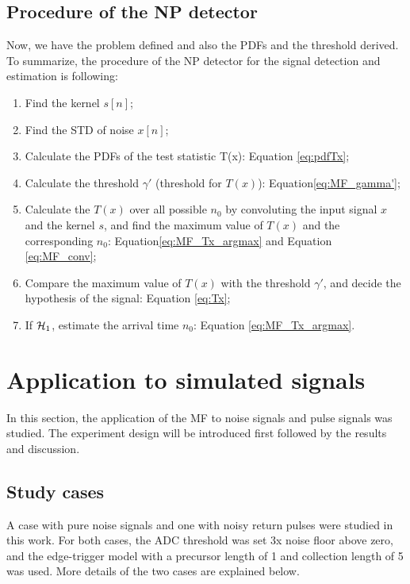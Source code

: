 \subsection{Procedure of the NP detector}
Now, we have the problem defined and also the PDFs and the threshold derived. To summarize, the procedure of the NP detector for the signal detection and estimation is following:
\begin{enumerate}
\item Find the kernel $s[n]$;
\item Find the STD of noise $x[n]$;
\item Calculate the PDFs of the test statistic T(x): Equation \eqref{eq:pdfTx}; 
\item Calculate the threshold $\gamma'$ (threshold for $T(x)$): Equation\eqref{eq:MF_gamma'};
\item Calculate the $T(x)$ over all possible $n_0$ by convoluting the input signal $x$ and the kernel $s$, and find the maximum value of $T(x)$ and the corresponding $n_0$: Equation\eqref{eq:MF_Tx_argmax} and Equation \eqref{eq:MF_conv};
\item Compare the maximum value of $T(x)$ with the threshold $\gamma'$, and decide the hypothesis of the signal: Equation \eqref{eq:Tx};
\item If $\operatorname*{\mathcal{H}_1}$, estimate the arrival time $n_0$: Equation \eqref{eq:MF_Tx_argmax}.
\end{enumerate}
\section{Application to simulated signals}
In this section, the application of the MF to noise signals and pulse signals was studied. The experiment design will be introduced first followed by the results and discussion.\par
\subsection{Study cases}
A case with pure noise signals and one with noisy return pulses were studied in this work. For both cases, the ADC threshold was set 3x noise floor above zero, and the edge-trigger model with a precursor length of 1 and collection length of 5 was used. More details of the two cases are explained below.
